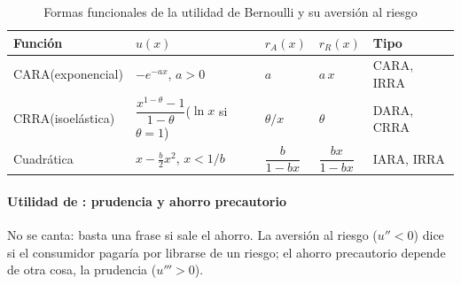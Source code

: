 \documentclass[11pt]{article}
\begin{document}
\begin{table}[H]
\centering
\caption{Formas funcionales de la utilidad de Bernoulli y su aversión al riesgo}\label{tab:formas-aversion}
\renewcommand{\arraystretch}{1.25}
\begin{tabular}{>{\centering\arraybackslash}m{2.8cm}>{\centering\arraybackslash}m{3.8cm}>{\centering\arraybackslash}m{2.2cm}>{\centering\arraybackslash}m{2.2cm}>{\centering\arraybackslash}m{2.4cm}}
\toprule
\rowcolor{tceeazulpalido}
\textbf{Función} & $u(x)$ & $r_A(x)$ & $r_R(x)$ & \textbf{Tipo}\\
\midrule
CARA\newline (exponencial) & $-e^{-ax}$, $a>0$ & $a$ & $a\,x$ & CARA, IRRA\\[4pt]
\rowcolor{tceesalvia}
CRRA\newline (isoelástica) & $\dfrac{x^{1-\theta}-1}{1-\theta}$\newline ($\ln x$ si $\theta=1$) & $\theta/x$ & $\theta$ & DARA, CRRA\\[4pt]
Cuadrática & $x-\tfrac{b}{2}x^2$, $x<1/b$ & $\dfrac{b}{1-bx}$ & $\dfrac{bx}{1-bx}$ & IARA, IRRA\\
\bottomrule
\end{tabular}
\end{table}

\paragraph{Utilidad de : prudencia y ahorro precautorio}

\begin{notaopositor}
No se canta: basta una frase si sale el ahorro. La aversión al riesgo ($u''<0$) dice si el consumidor pagaría por librarse de un riesgo; el ahorro precautorio depende de otra cosa, la prudencia ($u'''>0$).
\end{notaopositor}
\end{document}

